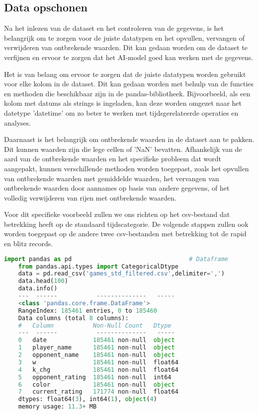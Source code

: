 \subsection{Data opschonen}

Na het inlezen van de dataset en het controleren van de gegevens, is het belangrijk om te zorgen voor de juiste datatypen en het opvullen, vervangen of verwijderen van ontbrekende waarden. Dit kan gedaan worden om de dataset te verfijnen en ervoor te zorgen dat het AI-model goed kan werken met de gegevens.

Het is van belang om ervoor te zorgen dat de juiste datatypen worden gebruikt voor elke kolom in de dataset. Dit kan gedaan worden met behulp van de functies en methoden die beschikbaar zijn in de pandas-bibliotheek. Bijvoorbeeld, als een kolom met datums als strings is ingeladen, kan deze worden omgezet naar het datetype 'datetime' om zo beter te werken met tijdsgerelateerde operaties en analyses.

Daarnaast is het belangrijk om ontbrekende waarden in de dataset aan te pakken. Dit kunnen waarden zijn die lege cellen of 'NaN' bevatten. Afhankelijk van de aard van de ontbrekende waarden en het specifieke probleem dat wordt aangepakt, kunnen verschillende methoden worden toegepast, zoals het opvullen van ontbrekende waarden met gemiddelde waarden, het vervangen van ontbrekende waarden door aannames op basis van andere gegevens, of het volledig verwijderen van rijen met ontbrekende waarden.

Voor dit specifieke voorbeeld zullen we ons richten op het csv-bestand dat betrekking heeft op de standaard tijdscategorie. De volgende stappen zullen ook worden toegepast op de andere twee csv-bestanden met betrekking tot de rapid en blitz records.

\begin{lstlisting}[language=Python]
    import pandas as pd                                 # Dataframe
    from pandas.api.types import CategoricalDtype
    data = pd.read_csv('games_std_filtered.csv',delimiter=',')
    data.head(100)
    data.info()
    ---  ------           --------------   -----  
    <class 'pandas.core.frame.DataFrame'>
    RangeIndex: 185461 entries, 0 to 185460
    Data columns (total 8 columns):
    #   Column           Non-Null Count   Dtype  
    ---  ------           --------------   -----  
    0   date             185461 non-null  object 
    1   player_name      185461 non-null  object 
    2   opponent_name    185461 non-null  object 
    3   w                185461 non-null  float64
    4   k_chg            185461 non-null  float64
    5   opponent_rating  185461 non-null  int64  
    6   color            185461 non-null  object 
    7   current_rating   171774 non-null  float64
    dtypes: float64(3), int64(1), object(4)
    memory usage: 11.3+ MB
\end{lstlisting}

